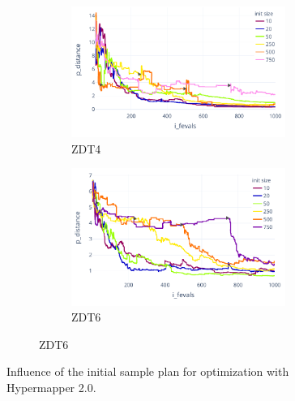 \begin{figure}
        
        \begin{subfigure}{\textwidth}
            \begin{subfigure}{0.45\textwidth}
                \includegraphics[width=\textwidth]{content/images/hypermapper_zdt4_start_set}
                \caption{ZDT4}
                \label{fig:hmapper_zdt4_start_set}
            \end{subfigure}
            \begin{subfigure}{0.45\textwidth}
                \includegraphics[width=\textwidth]{content/images/hypermapper_zdt6_start_set}
                \caption{ZDT6}
                \label{fig:hmapper_zdt6_start_set}
            \end{subfigure}
        \end{subfigure} 

        \caption[Influence of the initial sample plan for optimization with Hypermapper 2.0.]{Influence of the initial sample plan for optimization with Hypermapper 2.0.}
        \label{fig:hmapper_start_set}    
    \end{figure}



